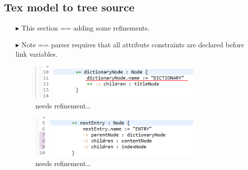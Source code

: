 \newpage
\hypertarget{m2ttex}{}
\subsection{Tex model to tree source}
\texHeader

\begin{itemize}

\item[$\blacktriangleright$] This section == adding some refinements.

\item[$\blacktriangleright$] Note ==  parser requires that all attribute constraints are declared before link variables.

\begin{figure}[htp]
\begin{center}
  \includegraphics[width=0.8\textwidth]{eclipse_NodeToDictionaryRule_updated}
  \caption[labelInTOC]{needs refinement\ldots}
  \label{eclipse:generatedBkwrdMdl}
\end{center}
\end{figure}

\begin{figure}[htp]
\begin{center}
  \includegraphics[width=0.8\textwidth]{eclipse_ForAllEntryRule_updated}
  \caption[labelInTOC]{needs refinement\ldots}
  \label{eclipse:generatedBkwrdMdl}
\end{center}
\end{figure} 

\end{itemize}